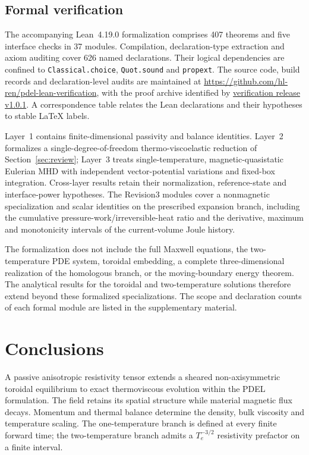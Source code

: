 \documentclass[11pt,a4paper]{article}
\theoremstyle{remark}\newtheorem{remark}{Remark}
\numberwithin{equation}{section}
\newcommand{\repositoryurl}{\url{https://github.com/hl-ren/pdel-lean-verification}}
\newcommand{\repositoryarchive}{\href{https://github.com/hl-ren/pdel-lean-verification/releases/tag/v1.0.1}{verification release v1.0.1}}
\begin{document}
\subsection{Formal verification}\label{sec:formal}
The accompanying Lean~4.19.0 formalization \citep{LeanValidation} comprises 407 theorems and five interface checks in 37 modules. Compilation, declaration-type extraction and axiom auditing cover 626 named declarations. Their logical dependencies are confined to \texttt{Classical.choice}, \texttt{Quot.sound} and \texttt{propext}. The source code, build records and declaration-level audits are maintained at \repositoryurl, with the proof archive identified by \repositoryarchive. A correspondence table relates the Lean declarations and their hypotheses to stable LaTeX labels.

Layer~1 contains finite-dimensional passivity and balance identities. Layer~2 formalizes a single-degree-of-freedom thermo-viscoelastic reduction of Section~\ref{sec:review}; Layer~3 treats single-temperature, magnetic-quasistatic Eulerian MHD with independent vector-potential variations and fixed-box integration. Cross-layer results retain their normalization, reference-state and interface-power hypotheses. The Revision3 modules cover a nonmagnetic specialization and scalar identities on the prescribed expansion branch, including the cumulative pressure-work/irreversible-heat ratio and the derivative, maximum and monotonicity intervals of the current-volume Joule history.

The formalization does not include the full Maxwell equations, the two-temperature PDE system, toroidal embedding, a complete three-dimensional realization of the homologous branch, or the moving-boundary energy theorem. The analytical results for the toroidal and two-temperature solutions therefore extend beyond these formalized specializations. The scope and declaration counts of each formal module are listed in the supplementary material.


\section{Conclusions}\label{sec:discussion}
A passive anisotropic resistivity tensor extends a sheared non-axisymmetric toroidal equilibrium to exact thermoviscous evolution within the PDEL formulation. The field retains its spatial structure while material magnetic flux decays. Momentum and thermal balance determine the density, bulk viscosity and temperature scaling. The one-temperature branch is defined at every finite forward time; the two-temperature branch admits a $T_e^{-3/2}$ resistivity prefactor on a finite interval.
\end{document}
